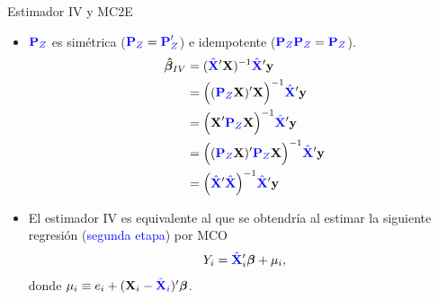\documentclass[10pt, xcolor=dvipsnames]{beamer}
\begin{document}
\begin{frame}{Estimador IV y MC2E}
\begin{itemize}
\item $\textcolor{blue}{\textbf{P}_Z}$ es simétrica ($\textcolor{blue}{\textbf{P}_Z}=\textcolor{blue}{\textbf{P}'_Z}$) e idempotente ($\textcolor{blue}{\textbf{P}_Z}\textcolor{blue}{\textbf{P}_Z}=\textcolor{blue}{\textbf{P}_Z}$).
\begin{align*}
\begin{split}
\boldsymbol{\hat{\beta}}_{IV} &= (\textcolor{blue}{\hat{\textbf{X}}}'\textbf{X})^{-1}\textcolor{blue}{\hat{\textbf{X}}}'\textbf{y} \\
&= \Big((\textcolor{blue}{\textbf{P}_Z} \textbf{X})'\textbf{X}\Big)^{-1}\textcolor{blue}{\hat{\textbf{X}}}'\textbf{y} \\
&= \Big( \textbf{X}'\textcolor{blue}{\textbf{P}_Z}\textbf{X}\Big)^{-1}\textcolor{blue}{\hat{\textbf{X}}}'\textbf{y} \\ 
&= \Big((\textcolor{blue}{\textbf{P}_Z} \textbf{X})' \textcolor{blue}{\textbf{P}_Z}\textbf{X}\Big)^{-1}\textcolor{blue}{\hat{\textbf{X}}}'\textbf{y} \\
&= \Big(\textcolor{blue}{\hat{\textbf{X}}}'\textcolor{blue}{\hat{\textbf{X}}}\Big)^{-1}\textcolor{blue}{\hat{\textbf{X}}}'\textbf{y} \\
\end{split}
\end{align*}
\item El estimador IV es equivalente al que se obtendría al estimar la siguiente regresión (\textcolor{blue}{segunda etapa}) por MCO \vspace{-0.0cm}
\begin{align*}
\begin{split}
Y_{i} &= \textcolor{blue}{\hat{\textbf{X}}}'_i\boldsymbol{\beta} + \mu_{i}, \\
\end{split}
\end{align*}	
donde $\mu_i \equiv e_i + (\textbf{X}_i - \textcolor{blue}{\hat{\textbf{X}}_i})'\boldsymbol{\beta}$. \hyperlink{DIAP:MC2E}{{}}
\end{itemize}
\end{frame}	
\end{document}
